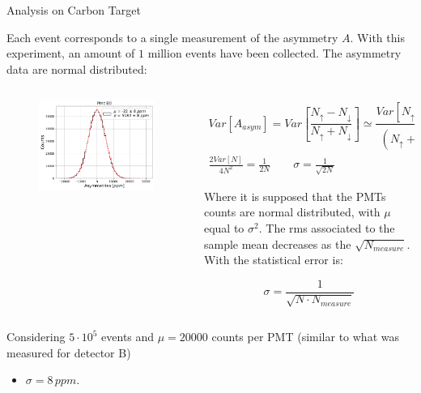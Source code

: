 \documentclass[9pt,a4paper]{beamer}
\begin{document}
\begin{frame}[t]{Analysis on Carbon Target}

Each event corresponds to a single measurement of the asymmetry $A$. With this experiment, an amount of $1$ million events have been collected. The asymmetry data are normal distributed:

\begin{columns}
\begin{column}{0.5\textwidth}
\begin{figure}
\includegraphics[width = \textwidth]{figures/B0.pdf}
\end{figure}
\end{column}
\begin{column}{0.5\textwidth}
\begin{gather*}
Var[A_{asym}] = Var[\dfrac{N_{\uparrow} - N_{\downarrow}}{ N_{\uparrow} + N_{\downarrow}}] \simeq \dfrac{Var[N_{\uparrow} - N_{\downarrow}]}{(N_{\uparrow} + N_{\downarrow})^{2}} \\
\frac{2Var[N]}{4N^{2}} = \frac{1}{2N} \qquad \sigma = \frac{1}{\sqrt{2N}}
\end{gather*}

Where it is supposed that the PMTs counts are normal distributed, with $\mu$ equal to $\sigma^{2}$. The rms associated to the sample mean decreases as the $\sqrt{N_{measure}}$. With the statistical error is:

\begin{equation}
\sigma = \dfrac{1}{\sqrt{N \cdot N_{measure}}} 
\end{equation}
\end{column}
\end{columns}

Considering $5\cdot 10^{5}$ events and $\mu = 20000$ counts per PMT (similar to what was measured for detector B) 

\begin{itemize}
\centering
\item $\sigma = 8 \, ppm$.
\end{itemize}
\end{frame}
\end{document}
